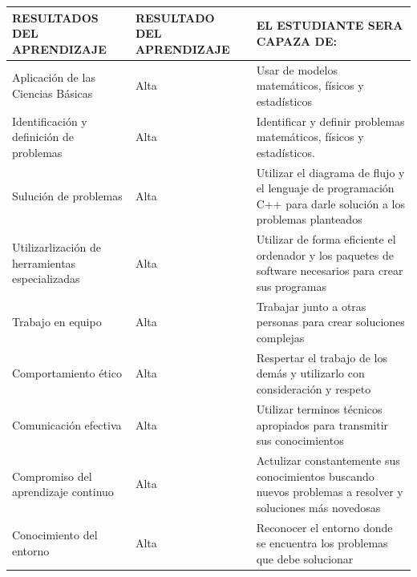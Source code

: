 \documentclass[a4paper,12pt,spanish]{article}
\begin{document}
\begin{tabular}[H]{|m{8cm}|m{3cm}|m{10cm}|}
  \hline
  \rowcolor{unidad7!50}
 
  RESULTADOS DEL APRENDIZAJE & RESULTADO DEL APRENDIZAJE  & EL ESTUDIANTE SERA CAPAZA DE: \\ \hline
Aplicación de las Ciencias Básicas   & Alta
                     & Usar de modelos matemáticos, físicos y estadísticos  \\ \hline
  Identificación y definición de problemas
                             & Alta
                     & Identificar y definir problemas matemáticos, físicos y estadísticos.  \\ \hline
  Sulución de problemas
                             & Alta
                     & Utilizar el diagrama de flujo y el lenguaje de programación C++ para darle solución a los problemas planteados  \\ \hline
  Utilizarlización de herramientas especializadas
                             & Alta
                     & Utilizar de forma eficiente el ordenador y los paquetes de software  necesarios para crear sus programas  \\ \hline
  Trabajo en equipo
                             & Alta
                     & Trabajar junto a otras personas para crear soluciones complejas  \\ \hline
  Comportamiento ético
                             & Alta
                     & Respertar el trabajo de los demás y utilizarlo con consideración y respeto  \\ \hline
  Comunicación efectiva
                             & Alta
                     & Utilizar terminos técnicos apropiados para transmitir sus conocimientos  \\ \hline
  Compromiso del aprendizaje continuo
                             & Alta
                     & Actulizar constantemente sus conocimientos buscando nuevos problemas a resolver y soluciones más novedosas  \\ \hline
  Conocimiento del entorno
                             & Alta
                     & Reconocer el entorno donde se encuentra los problemas que debe solucionar  \\ \hline

\end{tabular}





\newpage




\restoregeometry
\end{document}
